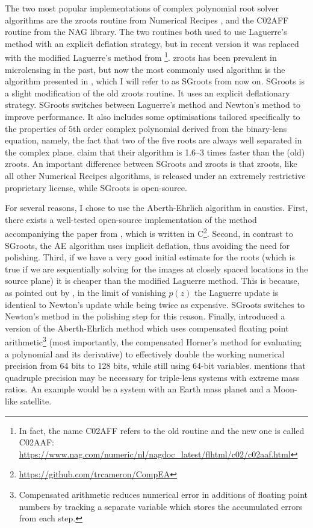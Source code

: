 \documentclass[12pt,dvipsnames]{report}
\newcommand{\ssf}[1]{\textsf{#1}}
\begin{document}
The two most popular implementations of complex polynomial root solver algorithms are
the \ssf{zroots} routine from Numerical Recipes \citep{1992nrca.book.....P}, and the
\ssf{C02AFF} routine from the NAG library. The two routines both used to use
Laguerre's method with an explicit deflation strategy, but in recent version it 
was replaced with the modified Laguerre's method from 
\citet{cameron2019}\footnote{In fact, the name
    \ssf{C02AFF} refers to the old routine and the new one is called \ssf{C02AAF}:
    \url{https://www.nag.com/numeric/nl/nagdoc_latest/flhtml/c02/c02aaf.html}}. 
   \ssf{zroots}  has been prevalent in microlensing in the past, but now the most commonly
used algorithm is the algorithm presented in \citet{2012arXiv1203.1034S},
which I will refer to as \ssf{SGroots} from now on. \ssf{SGroots} is a slight
modification of the old \ssf{zroots} routine. It uses an explicit deflationary
strategy. \ssf{SGroots} switches between Laguerre's method and Newton's method to improve
performance. It also includes some optimisations tailored specifically to the
properties of $5$th order complex polynomial derived from the binary-lens equation, 
namely, the fact that two of the five roots are always well separated in the complex plane. 
\citet{2012arXiv1203.1034S} claim that their algorithm is
1.6--3 times faster than the (old) \ssf{zroots}. An  important difference between 
\ssf{SGroots} and \ssf{zroots} is that \ssf{zroots}, like all other Numerical Recipes 
algorithms, is released under an extremely restrictive proprietary license, while 
\ssf{SGroots} is open-source.

For several reasons,  I chose to use the Aberth-Ehrlich algorithm in \ssf{caustics}.
First, there exists a well-tested open-source implementation of the method 
accompaniying the paper from \citet{cameron2021}, which is written 
in \ssf{C}\footnote{\url{https://github.com/trcameron/CompEA}}. 
Second, in contrast to \ssf{SGroots}, the AE algorithm uses implicit deflation, thus avoiding the 
need for polishing. Third, if we have a very good initial 
estimate for the roots (which is true if we are sequentially solving for the images at closely spaced 
locations in the source plane) it is cheaper than the  modified Laguerre method.
This is because, 
as pointed out by \citet{2012arXiv1203.1034S}, in the limit of vanishing $p(z)$ the 
Laguerre update is identical to Newton's update while being twice as expensive.
\ssf{SGroots} switches to Newton's method in the polishing step for this reason. Finally,
\citet{cameron2021} introduced a version of the Aberth-Ehrlich method which uses
compensated floating point arithmetic\footnote{Compensated arithmetic reduces  numerical
error in additions of floating point numbers by tracking a separate variable which 
stores the accumulated errors from each step.} (most importantly, the compensated Horner's method 
for evaluating a polynomial and its derivative) to effectively double the 
working numerical precision from 64 bits to 128 bits, while still using 64-bit variables.
\citet{2010ApJ...716.1408B} mentions that quadruple precision may be necessary
for triple-lens systems with extreme mass ratios. An example would be a system with an Earth
mass planet and a Moon-like satellite.
\end{document}
